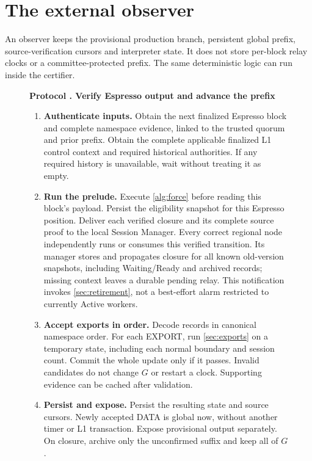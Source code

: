\documentclass[11pt,a4paper]{article}
\newcounter{protocol}
\newenvironment{protocol}[3][htbp]{\begin{figure}[#1]\refstepcounter{protocol}\label{#2}
\begin{mdframed}[linewidth=.6pt,skipabove=0pt,skipbelow=0pt,
innertopmargin=7pt,innerbottommargin=7pt]\small
\textbf{Protocol \theprotocol. #3}\par\smallskip}{\end{mdframed}\end{figure}}
\begin{document}
\section{The external observer}
\label{sec:observers}
An observer keeps the provisional production branch, persistent global
prefix, source-verification cursors and interpreter state. It does not
store per-block relay clocks or a committee-protected prefix.
The same deterministic logic can run inside the certifier.

\begin{protocol}{alg:external}{Verify Espresso output and advance the prefix}
\begin{enumerate}[label=\textbf{\arabic*)},itemsep=3pt]
\item \textbf{Authenticate inputs.} Obtain the next finalized
Espresso block and complete namespace evidence, linked to the trusted
quorum and prior prefix. Obtain the complete applicable finalized L1
control context and required historical authorities. If any required
history is unavailable, wait without treating it as empty.

\item \textbf{Run the prelude.} Execute \cref{alg:force} before
reading this block's payload. Persist the eligibility snapshot for this
Espresso position. Deliver each verified closure and its complete source
proof to the local Session Manager. Every correct regional node independently
runs or consumes this verified transition. Its manager stores and propagates
closure for all known old-version snapshots, including Waiting/Ready and
archived records; missing context leaves a durable pending relay.
This notification invokes \cref{sec:retirement}, not a best-effort alarm
restricted to currently Active workers.

\item \textbf{Accept exports in order.} Decode records in canonical
namespace order. For each EXPORT, run \cref{sec:exports} on a temporary
state, including each normal boundary and session count. Commit the
whole update only if it passes. Invalid candidates do not change $G$
or restart a clock. Supporting evidence can be cached after validation.

\item \textbf{Persist and expose.} Persist the resulting state and
source cursors. Newly accepted DATA is global now, without another
timer or L1 transaction. Expose provisional output separately.
On closure, archive only the unconfirmed suffix and keep all of $G$.
\end{enumerate}
\end{protocol}
\end{document}
